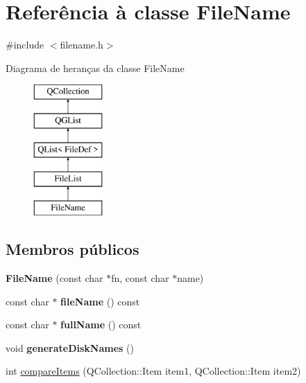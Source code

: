 \hypertarget{class_file_name}{\section{Referência à classe File\-Name}
\label{class_file_name}
}


{\ttfamily \#include $<$filename.\-h$>$}

Diagrama de heranças da classe File\-Name\begin{figure}[H]
\begin{center}
\leavevmode
\includegraphics[height=5.000000cm]{class_file_name}
\end{center}
\end{figure}
\subsection*{Membros públicos}
\begin{DoxyCompactItemize}
\item 
\hypertarget{class_file_name_ac426a5de1bbcca52739f152071603259}{{\bfseries File\-Name} (const char $\ast$fn, const char $\ast$name)}\label{class_file_name_ac426a5de1bbcca52739f152071603259}

\item 
\hypertarget{class_file_name_a69ea99cfdfc030ff3e5c938cc158b329}{const char $\ast$ {\bfseries file\-Name} () const }\label{class_file_name_a69ea99cfdfc030ff3e5c938cc158b329}

\item 
\hypertarget{class_file_name_ad4c1d4d93c3a44a05d525002226359d8}{const char $\ast$ {\bfseries full\-Name} () const }\label{class_file_name_ad4c1d4d93c3a44a05d525002226359d8}

\item 
\hypertarget{class_file_name_a9887211fd6309b5672ee9d5bfdd251f7}{void {\bfseries generate\-Disk\-Names} ()}\label{class_file_name_a9887211fd6309b5672ee9d5bfdd251f7}

\item 
int \hyperlink{class_file_name_a219450accf048597ffc7113ecde4c402}{compare\-Items} (Q\-Collection\-::\-Item item1, Q\-Collection\-::\-Item item2)
\end{DoxyCompactItemize}
